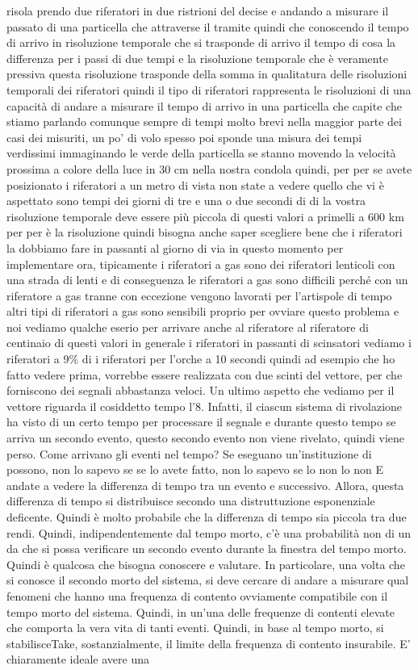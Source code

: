 risola prendo due riferatori in due ristrioni del decise e andando a misurare il passato di una particella che attraverse il tramite quindi che conoscendo il tempo di arrivo in risoluzione temporale che si trasponde di arrivo il tempo di cosa la differenza per i passi di due tempi e la risoluzione temporale che è veramente pressiva questa risoluzione trasponde della somma in qualitatura delle risoluzioni temporali dei riferatori quindi il tipo di riferatori rappresenta le risoluzioni di una capacità di andare a misurare il tempo di arrivo in una particella che capite che stiamo parlando comunque sempre di tempi molto brevi nella maggior parte dei casi dei misuriti, un po' di volo spesso poi sponde una misura dei tempi verdissimi immaginando le verde della particella se stanno movendo la velocità prossima a colore della luce in 30 cm nella nostra condola quindi, per per se avete posizionato i riferatori a un metro di vista non state a vedere quello che vi è aspettato sono tempi dei giorni di tre e una o due secondi di di la vostra risoluzione temporale deve essere più piccola di questi valori a primelli a 600 km per per è la risoluzione quindi bisogna anche saper scegliere bene che i riferatori la dobbiamo fare in passanti al giorno di via in questo momento per implementare ora, tipicamente i riferatori a gas sono dei riferatori lenticoli con una strada di lenti e di conseguenza le riferatori a gas sono difficili perché con un riferatore a gas tranne con eccezione vengono lavorati per l'artispole di tempo altri tipi di riferatori a gas sono sensibili proprio per ovviare questo problema e noi vediamo qualche eserio per arrivare anche al riferatore al riferatore di centinaio di questi valori in generale i riferatori in passanti di scinsatori vediamo i riferatori a 9\% di i riferatori per l'orche a 10 secondi quindi ad esempio che ho fatto vedere prima, vorrebbe essere realizzata con due scinti del vettore, per che forniscono dei segnali abbastanza veloci. Un ultimo aspetto che vediamo per il vettore riguarda il cosiddetto tempo l'8. Infatti, il ciascun sistema di rivolazione ha visto di un certo tempo per processare il segnale e durante questo tempo se arriva un secondo evento, questo secondo evento non viene rivelato, quindi viene perso. Come arrivano gli eventi nel tempo? Se eseguano un'instituzione di possono, non lo sapevo se se lo avete fatto, non lo sapevo se lo non lo non E andate a vedere la differenza di tempo tra un evento e successivo. Allora, questa differenza di tempo si distribuisce secondo una distruttuzione esponenziale deficente. Quindi è molto probabile che la differenza di tempo sia piccola tra due rendi. Quindi, indipendentemente dal tempo morto, c'è una probabilità non di un da che si possa verificare un secondo evento durante la finestra del tempo morto. Quindi è qualcosa che bisogna conoscere e valutare. In particolare, una volta che si conosce il secondo morto del sistema, si deve cercare di andare a misurare qual fenomeni che hanno una frequenza di contento ovviamente compatibile con il tempo morto del sistema. Quindi, in un'una delle frequenze di contenti elevate che comporta la vera vita di tanti eventi. Quindi, in base al tempo morto, si stabilisceTake, sostanzialmente, il limite della frequenza di contento insurabile. E' chiaramente ideale avere una 